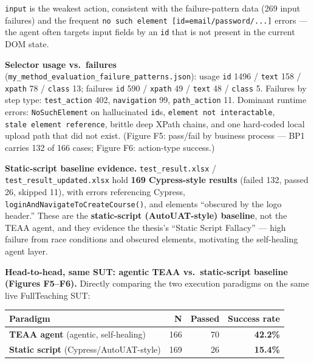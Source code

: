 \documentclass[
]{article}
\newcounter{none} %
\begin{document}
\texttt{input} is the weakest action, consistent with the
failure-pattern data (269 input failures) and the frequent
\texttt{no\ such\ element\ {[}id=email/password/...{]}} errors --- the
agent often targets input fields by an \texttt{id} that is not present
in the current DOM state.

\textbf{Selector usage vs.~failures}
(\texttt{my\_method\_evaluation\_failure\_patterns.json}): usage
\texttt{id} 1496 / \texttt{text} 158 / \texttt{xpath} 78 /
\texttt{class} 13; failures \texttt{id} 590 / \texttt{xpath} 49 /
\texttt{text} 48 / \texttt{class} 5. Failures by step type:
\texttt{test\_action} 402, \texttt{navigation} 99, \texttt{path\_action}
11. Dominant runtime errors: \texttt{NoSuchElement} on hallucinated
\texttt{id}s, \texttt{element\ not\ interactable},
\texttt{stale\ element\ reference}, brittle deep XPath chains, and one
hard-coded local upload path that did not exist. (Figure F5: pass/fail
by business process --- BP1 carries 132 of 166 cases; Figure F6:
action-type success.)

\textbf{Static-script baseline evidence.} \texttt{test\_result.xlsx} /
\texttt{test\_result\_updated.xlsx} hold \textbf{169 Cypress-style
results} (failed 132, passed 26, skipped 11), with errors referencing
Cypress, \texttt{loginAndNavigateToCreateCourse()}, and elements
``obscured by the logo header.'' These are the \textbf{static-script
(AutoUAT-style) baseline}, not the TEAA agent, and they evidence the
thesis's ``Static Script Fallacy'' --- high failure from race conditions
and obscured elements, motivating the self-healing agent layer.

\textbf{Head-to-head, same SUT: agentic TEAA vs.~static-script baseline
(Figures F5--F6).} Directly comparing the two execution paradigms on the
same live FullTeaching SUT:

{\def\LTcaptype{none} %
\begin{longtable}[]{@{}lrrr@{}}
\toprule\noalign{}
Paradigm & N & Passed & Success rate \\
\midrule\noalign{}
\endhead
\bottomrule\noalign{}
\endlastfoot
\textbf{TEAA agent} (agentic, self-healing) & 166 & 70 &
\textbf{42.2\%} \\
\textbf{Static script} (Cypress/AutoUAT-style) & 169 & 26 &
\textbf{15.4\%} \\
\end{longtable}
}
\end{document}
